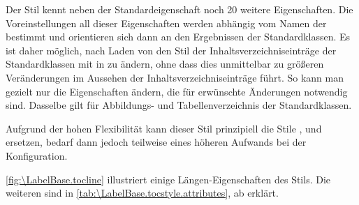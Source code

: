 \begin{description}
  Der Stil kennt neben der Standardeigenschaft  noch
  20
  weitere Eigenschaften. Die Voreinstellungen all dieser Eigenschaften werden
  abhängig vom Namen der  bestimmt und orientieren sich
  dann an den Ergebnissen der Standardklassen. Es ist daher möglich, nach
  Laden von  den Stil der Inhaltsverzeichniseinträge der
  Standardklassen mit  in
   zu ändern, ohne dass dies unmittelbar zu größeren
  Veränderungen im Aussehen der Inhaltsverzeichniseinträge führt. So kann man
  gezielt nur die Eigenschaften ändern, die für erwünschte Änderungen
  notwendig sind.  Dasselbe gilt für Abbildungs- und Tabellenverzeichnis der
  Standardklassen.%

  Aufgrund der hohen Flexibilität kann dieser Stil prinzipiell die Stile
  ,  und 
  ersetzen, bedarf dann jedoch teilweise eines höheren Aufwands bei der
  Konfiguration.

  \autoref{fig:\LabelBase.tocline} illustriert einige Längen-Eigenschaften des
  Stils. Die weiteren sind in \autoref{tab:\LabelBase.tocstyle.attributes}, ab
   erklärt.
  \begin{figure}
    \centering
\end{figure}
\end{description}
